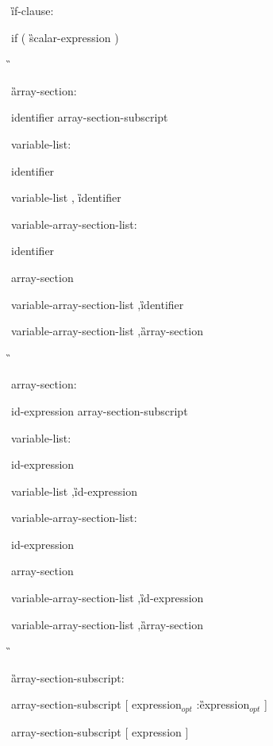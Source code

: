 {\G if-clause:

\C\I if ( \G scalar-expression \C )

\G\cspecificstart

\G array-section:

\I identifier array-section-subscript

variable-list:

\I identifier

\I variable-list \C, \G identifier

variable-array-section-list:

\I identifier

\I array-section

\I variable-array-section-list \C ,\G identifier

\I variable-array-section-list \C ,\G array-section

\G\cspecificend

\cppspecificstart

\I array-section:

\I id-expression array-section-subscript

variable-list:

\I id-expression

\I variable-list \C ,\G id-expression

variable-array-section-list:

\I id-expression

\I array-section

\I variable-array-section-list \C ,\G id-expression

\I variable-array-section-list \C ,\G array-section

\G\cppspecificend

\G array-section-subscript:

\I array-section-subscript [ expression$_{opt}$ \C :\G expression$_{opt}$ ]

\I array-section-subscript [ expression ]


\I [ expression ]

} %



